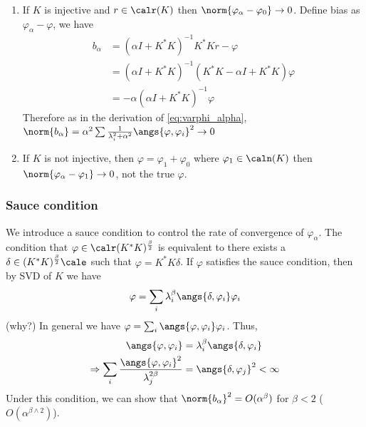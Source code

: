 \begin{enumerate}
    \item  If $K$ is injective and $r\in \calr(K)$ then
          $\norm{\varphi_\alpha-\varphi_0}\to 0$. Define bias as
          $\varphi_\alpha-\varphi$, we have \begin{equation*}
              \begin{split}
                  b_\alpha&=(\alpha I+K^*K)^{-1}K^*Kr-\varphi\\
                  &=(\alpha I+K^*K)^{-1}(K^*K-\alpha I+K^*K)\varphi\\
                  &=-\alpha(\alpha I+K^*K)^{-1}\varphi
              \end{split}
          \end{equation*}
          Therefore as in the derivation of \eqref{eq:varphi_alpha}, $\norm{b_\alpha} = \alpha^2\sum \frac{1}{\lambda_i^2+\alpha^2}\angs{\varphi,\varphi_i}^2\to 0$
    \item If $K$ is not injective, then $\varphi=\varphi_1+\varphi_0$ where $\varphi_1\in
              \caln(K)$ then $\norm{\varphi_\alpha-\varphi_1}\to 0$, not the true $\varphi$.
\end{enumerate}

\subsubsection{Sauce condition}
We introduce a sauce condition to control the rate of convergence of
$\varphi_\alpha$. The condition that $\varphi\in\calr(K^*K)^{\frac{\beta}{2}}$
is equivalent to there exists a $\delta\in (K^*K)^{\frac{\beta}{2}}\cale$ such
that $\varphi=K^*K\delta$. If $\varphi$ satisfies the sauce condition, then by
SVD of $K$ we have \begin{equation*}
    \varphi=\sum_i \lambda_i^\beta\angs{\delta,\varphi_i}\varphi_i
\end{equation*} {\color{red} (why?)}
In general we have $\varphi=\sum_i \angs{\varphi,\varphi_i}\varphi_i$.
Thus, \begin{align*}
    \angs{\varphi,\varphi_i} & =\lambda_i^\beta\angs{\delta,\varphi_i} \\ \Rightarrow \sum_i\frac{\angs{\varphi,\varphi_i}^2}{\lambda_j^{2\beta}}&=\angs{\delta,\varphi_j}^2 < \infty
\end{align*}
Under this condition, we can show that $\norm{b_\alpha}^2 = O(\alpha^{\beta})$ for $\beta<2$ ($O (\alpha^{\beta\wedge 2})$).